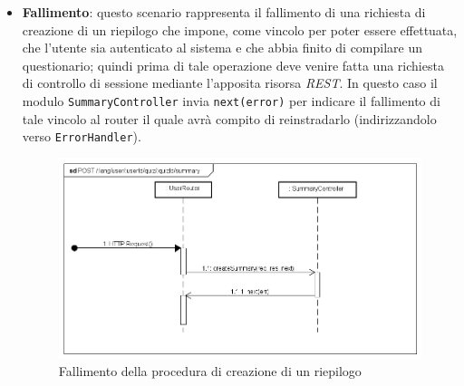 \begin{itemize}
\item \textbf{Fallimento}: questo scenario rappresenta il fallimento di una richiesta di creazione di un riepilogo che impone, come vincolo per poter essere effettuata, che l'utente sia autenticato al sistema e che abbia finito di compilare un questionario; quindi prima di tale operazione deve venire fatta una richiesta di controllo di sessione mediante l'apposita risorsa \textit{REST}. In questo caso il modulo \texttt{SummaryController} invia \texttt{next(error)} per indicare il fallimento di tale vincolo al router il quale avrà compito di reinstradarlo (indirizzandolo verso \texttt{ErrorHandler}).
\label{Fallimento della procedura di creazione di un riepilogo}
\begin{figure}[ht]
	\centering
	\includegraphics[scale=0.40]{UML/DiagrammiDiSequenza/Back-end/POST__lang_user_userId_quiz_quizId_summary_failure.png}
	\caption{Fallimento della procedura di creazione di un riepilogo}
\end{figure}
\FloatBarrier
\end{itemize}

